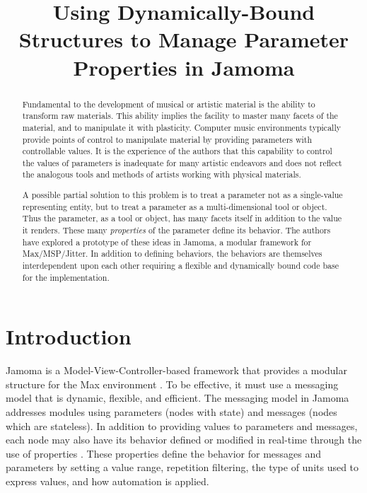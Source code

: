 \documentclass{article}
\title{Using Dynamically-Bound Structures to Manage Parameter Properties in Jamoma}
\begin{document}
%
\maketitle
%
\begin{abstract}

Fundamental to the development of musical or artistic material is the ability to transform raw materials.  This ability implies the facility to master many facets of the material, and to manipulate it with plasticity.  Computer music environments typically provide points of control to manipulate material by providing parameters with controllable values.  It is the experience of the authors that this capability to control the values of parameters is inadequate for many artistic endeavors and does not reflect the analogous tools and methods of artists working with physical materials.  

A possible partial solution to this problem is to treat a parameter not as a single-value representing entity, but to treat a parameter as a multi-dimensional tool or object.  Thus the parameter, as a tool or object, has many facets itself in addition to the value it renders.  These many \emph{properties} of the parameter define its behavior.  The authors have explored a prototype of these ideas in Jamoma, a modular framework for Max/MSP/Jitter.  In addition to defining behaviors, the behaviors are themselves interdependent upon each other requiring a flexible and dynamically bound code base for the implementation.

\end{abstract}




%
\section{Introduction}\label{sec:introduction}

Jamoma is a Model-View-Controller-based framework that provides a modular structure for the Max environment \cite{Place:2006}.  To be effective, it must use a messaging model that is dynamic, flexible, and efficient. The messaging model in Jamoma addresses modules using parameters (nodes with state) and messages (nodes which are stateless). In addition to providing values to parameters and messages, each node may also have its behavior defined or modified in real-time through the use of properties \cite{Place:2008}.  %
These properties define the behavior for messages and parameters by setting a value range, repetition filtering, the type of units used to express values, and how automation is applied.
\end{document}
